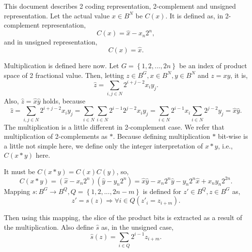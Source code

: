 \documentclass[a4paper]{article}
\newcommand{\eqlabel}[1]{\label{#1}\tag{#1}}
\newcommand{\br}[1]{\left(#1\right)}
\newcommand{\cbr}[1]{\left\{#1\right\}}
\newcommand{\hx}{{\hat{x}}}
\newcommand{\hy}{{\hat{y}}}
\newcommand{\hz}{{\hat{z}}}
\newcommand{\hs}{{\hat{s}}}
\begin{document}
This document describes 2 coding representation, 2-complement and unsigned representation. Let the actual value \(x\in B^N\) be \(C(x)\). It is defined as, in 2-complement representation, 
\begin{equation}
    \eqlabel{eC0}
C(x) = \hx - x_n 2^n,
\end{equation}
and in unsigned representation, 
\begin{equation}
    \eqlabel{eC1}
C(x) = \hx.
\end{equation}

Multiplication is defined here now. Let \(G = \cbr{1, 2,..., 2n}\) be an index of product space of 2 fractional value. Then, letting \(z\in B^G, x\in B^N, y\in B^N\) and \(z=xy\), it is,
\[
    \hz = \sum_{i, j\in N} 2^{i+j-2} x_i y_j.
\]
Also, \(\hz = \hx\hy\) holds, because
\begin{equation}
    \eqlabel{eMulHom}
    \hz = \sum_{i, j\in N} 2^{i+j-2} x_i y_j = \sum_{i\in N}\sum_{i\in N} 2^{i -1}2^{j-2} x_i y_j = \sum_{i\in N}2^{i -1} x_i\sum_{i\in N}  2^{j-2}y_j =  \hx \hy.
\end{equation}
The multiplication is a little different in 2-complement case. We refer that multiplication of 2-complements as \(*\). Because defining multiplication \(*\) bit-wise is a little not simple here, we define only the integer interpretation of \(x*y\), i.e., \(C(x*y)\) here.

It must be \(C(x*y) = C(x)C(y)\), so,
\begin{equation}
    \eqlabel{eC}
    C(x*y) =  \br{\hx - x_n 2^{n}} \br{\hy - y_n 2^{n}} = \hx\hy - x_n 2^n \hy - y_n 2^n \hx + x_n y_n 2^{2n}.
\end{equation}
Mapping \(s: B^G \to B^Q, Q = \cbr{1,2,...,2n-m}\) is defined for \(z'\in B^Q, z\in B^{G}\) as,
\[
    z' = s(z) \Rightarrow \forall i\in Q\br{z'_i = z_{i + m}}.
\]

Then using this mapping, the slice of the product bits is extracted as a result of the multiplication. Also define \(\hs\) as, in the unsigned case,
\begin{equation}
    \eqlabel{ehs}
    \hs(z) = \sum_{i\in Q} 2^{i-1} z_{i+m}.
\end{equation}
\end{document}
